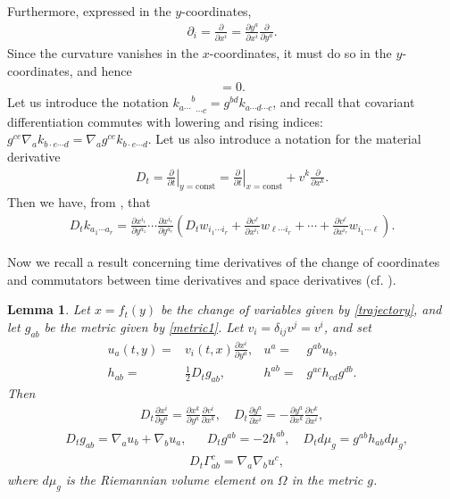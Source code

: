 \documentclass[12pt,reqno]{amsart}
\numberwithin{equation}{section}
\newtheorem{lemma}[theorem]{Lemma}
\theoremstyle{definition}
\theoremstyle{remark}
\begin{document}
Furthermore, expressed in the $y$-coordinates,
\begin{align}\label{eq.Di}
  {\partial}_i=\frac{\partial}{{\partial} x^i}=\frac{{\partial} y^a}{{\partial} x^i}\frac{\partial}{{\partial} y^a}.
\end{align}
Since the curvature vanishes in the $x$-coordinates, it must do so in the $y$-coordinates, and hence
\begin{align}
  [{\nabla}_a,{\nabla}_b]=0.
\end{align}
Let us introduce the notation ${{k_{a\cdots}}^b}_{\cdots c}=g^{bd}k_{a\cdots d\cdots c}$, and recall that covariant differentiation commutes with lowering and rising indices: $g^{ce}{\nabla}_a k_{b\cdot e\cdots d}={\nabla}_a g^{ce}k_{b\cdot e\cdots d}$. Let us also introduce a notation for the material derivative
\begin{align}
  D_t=\left.\frac{\partial}{{\partial} t}\right|_{y=\textrm{const}}=\left.\frac{\partial}{{\partial} t}\right|_{x=\textrm{const}}+v^k\frac{\partial}{{\partial} x^k}.
\end{align}
Then we have, from \cite[Lemma 2.2]{CL00}, that
\begin{align}\label{eq.Dt}
  D_tk_{a_1\cdots a_r}=\frac{{\partial} x^{i_1}}{{\partial} y^{a_1}}\cdots \frac{{\partial} x^{i_r}}{{\partial} y^{a_r}}\left(D_t w_{i_1\cdots i_r}+\frac{{\partial} v^\ell}{{\partial} x^{i_1}}w_{\ell\cdots i_r}+\cdots +\frac{{\partial} v^\ell}{{\partial} x^{i_r}}w_{i_1\cdots\ell}\right).
\end{align}

Now we recall a result concerning time derivatives of the change of
coordinates and commutators between time derivatives and space derivatives (cf. \cite[Lemma 2.1]{CL00}).

\begin{lemma}\label{lem.CL00lem2.1}
  Let $x=f_t(y)$ be the change of variables given by \eqref{trajectory}, and let $g_{ab}$ be the metric given by \eqref{metric1}. Let $v_i=\delta_{ij}v^j=v^i$, and set
  \begin{align}
  u_a(t,y)=&v_i(t,x)\frac{{\partial} x^i}{{\partial} y^a},  & u^a=&g^{ab}u_b,\label{eq.CL00lem2.1.1}\\
    h_{ab}=&\frac{1}{2}D_t g_{ab}, & h^{ab}=&g^{ac}h_{cd}g^{db}.\label{eq.CL00lem2.1.2}
  \end{align}
  Then
  \begin{align}\label{eq.CL00lem2.1.3}
    D_t\frac{{\partial} x^i}{{\partial} y^a}=\frac{{\partial} x^k}{{\partial} y^a} \frac{{\partial} v^i}{{\partial} x^k},\quad D_t\frac{{\partial} y^a}{{\partial} x^i}=-\frac{{\partial} y^a}{{\partial} x^k}\frac{{\partial} v^k}{{\partial} x^i},
  \end{align}
  \begin{align}\label{eq.CL00lem2.1.4}
    &D_t g_{ab}={\nabla}_a u_b+{\nabla}_b u_a, &&D_t g^{ab}=-2h^{ab},  \quad D_t d\mu_g=g^{ab}h_{ab}d\mu_g,
  \end{align}
  \begin{align}\label{eq.CL00lem2.1.5}
    &D_t \Gamma_{ab}^c={\nabla}_a{\nabla}_b u^c,
  \end{align}
  where $d\mu_g$ is the Riemannian volume element on $\Omega$ in the metric $g$.
\end{lemma}
\end{document}
